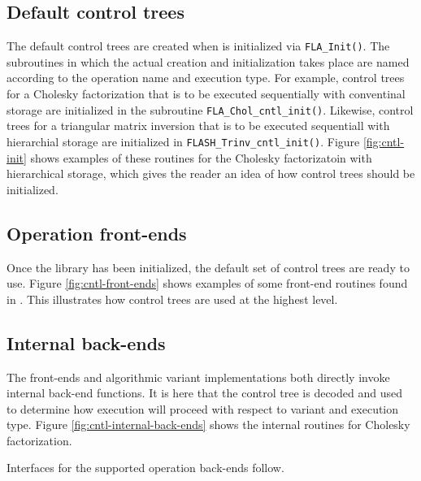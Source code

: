 \subsection{Default control trees}

The default control trees are created when \libflame is initialized via
{\tt FLA\_Init()}.
The subroutines in which the actual creation and initialization takes
place are named according to the operation name and execution type.
For example, control trees for a Cholesky factorization that is to be
executed sequentially with conventinal storage are initialized
in the subroutine {\tt FLA\_Chol\_cntl\_init()}.
Likewise, control trees for a triangular matrix inversion that is to be
executed sequentiall with hierarchial storage are initialized
in {\tt FLASH\_Trinv\_cntl\_init()}.
Figure \ref{fig:cntl-init} shows examples of these routines for
the Cholesky factorizatoin with hierarchical storage, which gives the
reader an idea of how control trees should be initialized.






\subsection{Operation front-ends}

Once the library has been initialized, the default set of control trees
are ready to use.
Figure \ref{fig:cntl-front-ends} shows examples of some front-end
routines found in \libflamens.
This illustrates how control trees are used at the highest level.






\subsection{Internal back-ends}


The \libflame front-ends and algorithmic variant implementations both
directly invoke internal back-end functions.
It is here that the control tree is decoded and used to determine
how execution will proceed with respect to variant and execution
type.
Figure \ref{fig:cntl-internal-back-ends} shows the internal routines
for Cholesky factorization.



Interfaces for the supported operation back-ends follow.



